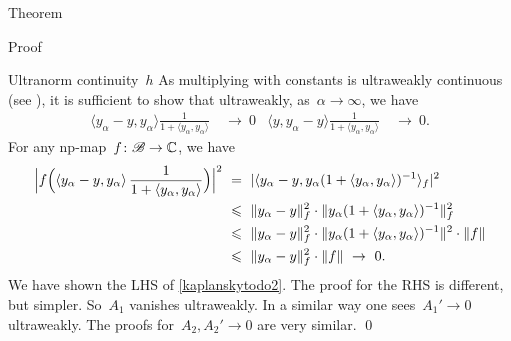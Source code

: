 \begin{parsec}
\begin{point}{Theorem}
\begin{point}{Proof}
\begin{point}{Ultranorm continuity~$h$}
As multiplying with
constants is ultraweakly continuous (see ),
    it is sufficient to show that ultraweakly, as~$\alpha \to \infty$, we have
\begin{align}\label{kaplanskytodo2}
    \langle y_\alpha - y, y_\alpha \rangle \frac{1}{1 + \langle y_\alpha, y_\alpha\rangle} & \ \to\  0 &
    \langle y, y_\alpha  -y\rangle \frac{1}{1 + \langle y_\alpha, y_\alpha\rangle} & \ \to \ 0.
\end{align}
For any np-map~$f\colon \mathscr{B} \to \mathbb{C}$, we have
\begin{align*}
   \Bigl| f\Bigl(\left\langle y_\alpha - y, y_\alpha \right\rangle \frac{1}{1+\langle y_\alpha, y_\alpha\rangle}\Bigr)\Bigr|^2
    & \ = \ 
    |\langle y_\alpha - y, y_\alpha (1 + \langle y_\alpha, y_\alpha  \rangle)^{-1}
    \rangle_f|^2 \\
    & \ \leq \ 
    \| y_\alpha - y \|^2_f \cdot \| y_\alpha (1 + \langle y_\alpha, y_\alpha  \rangle)^{-1} \|^2_f \\
    & \ \leq \  \|
    y_\alpha - y \|^2_f \cdot \| y_\alpha (1 + \langle y_\alpha, y_\alpha  \rangle)^{-1} \|^2 \cdot
    \|f\|
    \\
    & \ \leq \ 
    \| y_\alpha - y \|^2_f \cdot \|f\| \ \rightarrow \ 0.
\end{align*}
We have shown the LHS of \eqref{kaplanskytodo2}.
The proof for the RHS is different, but simpler.
So~$A_1$ vanishes ultraweakly.
In a similar way one sees~$A_1' \to 0$ ultraweakly.
The proofs for~$A_2, A_2' \to 0$ are very similar. \qed
\end{point}
\end{point}
\end{point}
\end{parsec}


